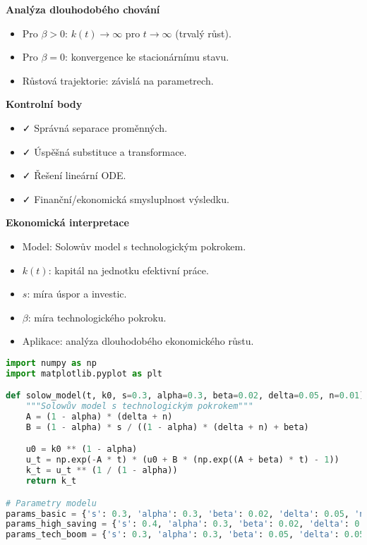 \begin{example}
\noindent\textbf{Analýza dlouhodobého chování}
\begin{itemize}
\item Pro $\beta > 0$: $k(t) \to \infty$ pro $t \to \infty$ (trvalý růst).
\item Pro $\beta = 0$: konvergence ke stacionárnímu stavu.
\item Růstová trajektorie: závislá na parametrech.
\end{itemize}

\noindent\textbf{Kontrolní body}
\begin{itemize}
\item ✓ Správná separace proměnných.
\item ✓ Úspěšná substituce a transformace.
\item ✓ Řešení lineární ODE.
\item ✓ Finanční/ekonomická smysluplnost výsledku.
\end{itemize}

\noindent\textbf{Ekonomická interpretace}
\begin{itemize}
\item Model: Solowův model s technologickým pokrokem.
\item $k(t)$: kapitál na jednotku efektivní práce.
\item $s$: míra úspor a investic.
\item $\beta$: míra technologického pokroku.
\item Aplikace: analýza dlouhodobého ekonomického růstu.
\end{itemize}

\begin{lstlisting}[language=Python, caption={Implementace Solowova modelu v~Pythonu}]
import numpy as np
import matplotlib.pyplot as plt

def solow_model(t, k0, s=0.3, alpha=0.3, beta=0.02, delta=0.05, n=0.01):
    """Solowův model s technologickým pokrokem"""
    A = (1 - alpha) * (delta + n)
    B = (1 - alpha) * s / ((1 - alpha) * (delta + n) + beta)

    u0 = k0 ** (1 - alpha)
    u_t = np.exp(-A * t) * (u0 + B * (np.exp((A + beta) * t) - 1))
    k_t = u_t ** (1 / (1 - alpha))
    return k_t

# Parametry modelu
params_basic = {'s': 0.3, 'alpha': 0.3, 'beta': 0.02, 'delta': 0.05, 'n': 0.01}
params_high_saving = {'s': 0.4, 'alpha': 0.3, 'beta': 0.02, 'delta': 0.05, 'n': 0.01}
params_tech_boom = {'s': 0.3, 'alpha': 0.3, 'beta': 0.05, 'delta': 0.05, 'n': 0.01}


\end{lstlisting}
\end{example}
